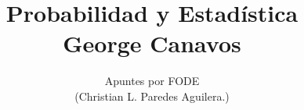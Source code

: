 \normalfont

\author{\Large Apuntes por FODE \\ \small (Christian L. Paredes Aguilera.)}
\title{Probabilidad y Estadística \\ \small George Canavos}
\date{}
\pagestyle{empty}
\maketitle
\thispagestyle{empty}
\let\cleardoublepage\clearpage
\tableofcontents								%


 
\let\cleardoublepage\clearpage
